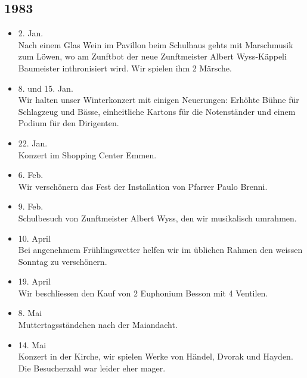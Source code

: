 \subsection{1983}

\begin{history}


    \begin{itemize}

        \item 2. Jan.\\
              Nach einem Glas Wein im Pavillon beim Schulhaus gehts mit Marschmusik
              zum Löwen, wo am Zunftbot der neue Zunftmeister Albert Wyss-Käppeli
              Baumeister inthronisiert wird. Wir spielen ihm 2 Märsche.

        \item 8. und 15. Jan.\\
              Wir halten unser Winterkonzert mit einigen Neuerungen: Erhöhte Bühne für
              Schlagzeug und Bässe, einheitliche Kartons für die Notenständer und
              einem Podium für den Dirigenten.

        \item 22. Jan.\\
              Konzert im Shopping Center Emmen.

        \item 6. Feb.\\
              Wir verschönern das Fest der Installation von Pfarrer Paulo Brenni.

        \item 9. Feb.\\
              Schulbesuch von Zunftmeister Albert Wyss, den wir musikalisch umrahmen.

        \item 10. April\\
              Bei angenehmem Frühlingswetter helfen wir im üblichen Rahmen den weissen
              Sonntag zu verschönern.

        \item 19. April\\
              Wir beschliessen den Kauf von 2 Euphonium Besson mit 4 Ventilen.

        \item 8. Mai\\
              Muttertagsständchen nach der Maiandacht.

        \item 14. Mai\\
              Konzert in der Kirche, wir spielen Werke von Händel, Dvorak und Hayden.
              Die Besucherzahl war leider eher mager.


\end{itemize}
\end{history}

